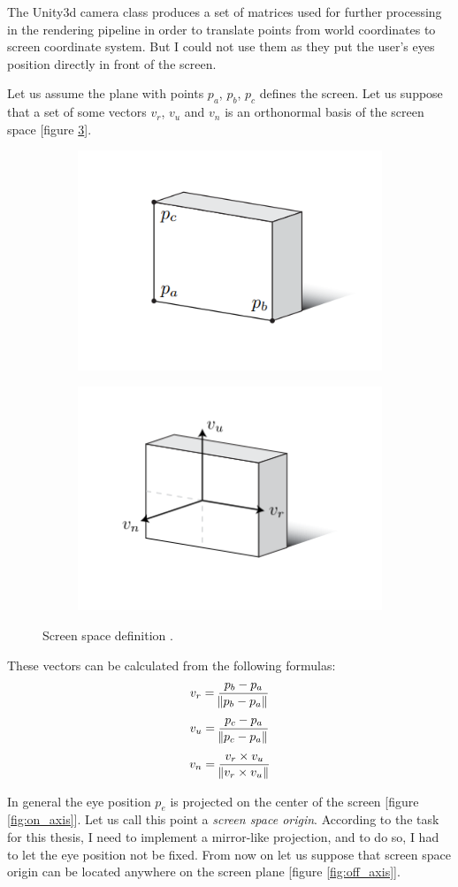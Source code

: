 \documentclass[a4paper]{report}
\begin{document}
\bigskip The Unity3d camera class produces a set of matrices used for further processing in the rendering pipeline in order to translate points from world coordinates to screen coordinate system. But I could not use them as they put the user's eyes position directly in front of the screen.

\bigskip Let us assume the plane with points $p_a$, $p_b$, $p_c$ defines the screen. Let us suppose that a set of some vectors $v_r$, $v_u$ and $v_n$ is an orthonormal basis of the screen space [figure \ref{fig:offaxis_1}].

\begin{figure}[H]
\centering
\begin{subfigure}{\textwidth}
  \includegraphics[width=.4\textwidth, keepaspectratio]{images/Scemas/pa_pb_pc_pd.png}
  \label{fig:pa_pb_pc_pd}
\end{subfigure}%
\begin{subfigure}{\textwidth}
  \includegraphics[width=.4\textwidth, keepaspectratio]{images/Scemas/Vn_Vu_Vr_basis.png}
  \label{fig:vn_vu_vr}
\end{subfigure}
\caption{Screen space definition \cite{offaxisKooima}.}
\label{fig:offaxis_1}
\end{figure}

\newpage

These vectors can be calculated from the following formulas\cite{offaxisKooima}:
 \[v_r = \frac{p_b - p_a}{\norm{p_b - p_a}}\]
\[v_u = \frac{p_c - p_a}{\norm{p_c - p_a}}\]
\[v_n = \frac{v_r \times v_u}{\norm{v_r \times v_u}}\]

 In general the eye position $p_e$ is projected on the center of the screen [figure \ref{fig:on_axis}]. Let us call this point a \textit{screen space origin}. According to the task for this thesis, I need to implement a mirror-like projection, and to do so, I had to let the eye position not be fixed. From now on let us suppose that screen space origin can be located anywhere on the screen plane [figure \ref{fig:off_axis}].
 
\end{document}
